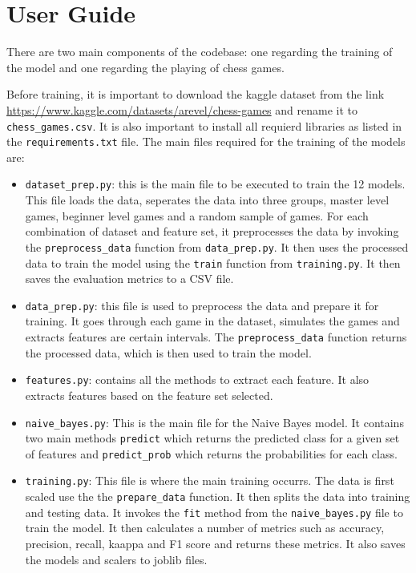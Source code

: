 \chapter{User Guide}

There are two main components of the codebase: one regarding the training of the model and one regarding the playing of chess games.

Before training, it is important to download the kaggle dataset from the link \url{https://www.kaggle.com/datasets/arevel/chess-games} and rename it to \texttt{chess\_games.csv}. It is also important to install all requierd libraries as listed in the \texttt{requirements.txt} file. The main files required for the training of the models are:

\begin{itemize}
    \item \texttt{dataset\_prep.py}: this is the main file to be executed to train the 12 models. This file loads the data, seperates the data into three groups, master level games, beginner level games and a random sample of games. For each combination of dataset and feature set, it preprocesses the data by invoking the \texttt{preprocess\_data} function from \texttt{data\_prep.py}. It then uses the processed data to train the model using the \texttt{train} function from \texttt{training.py}. It then saves the evaluation metrics to a CSV file.
    \item \texttt{data\_prep.py}: this file is used to preprocess the data and prepare it for training. It goes through each game in the dataset, simulates the games and extracts features are certain intervals. The \texttt{preprocess\_data} function returns the processed data, which is then used to train the model.
    \item \texttt{features.py}: contains all the methods to extract each feature. It also extracts features based on the feature set selected.
    \item \texttt{naive\_bayes.py}: This is the main file for the Naive Bayes model. It contains two main methods \texttt{predict} which returns the predicted class for a given set of features and \texttt{predict\_prob} which returns the probabilities for each class. 
    \item \texttt{training.py}: This file is where the main training occurrs. The data is first scaled use the the \texttt{prepare\_data} function. It then splits the data into training and testing data. It invokes the \texttt{fit} method from the \texttt{naive\_bayes.py} file to train the model. It then calculates a number of metrics such as accuracy, precision, recall, kaappa and F1 score and returns these metrics. It also saves the models and scalers to joblib files.
\end{itemize}



